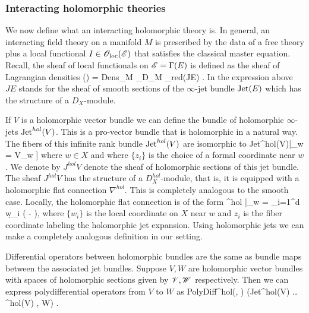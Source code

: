 \documentclass[10pt]{amsart}
\begin{document}
\subsubsection{Interacting holomorphic theories}

\def\olochol{\sO_{\rm loc}^{hol}}

We now define what an interacting holomorphic theory is.
In general, an interacting field theory on a manifold $M$ is prescribed by the data of a free theory plus a local functional $I \in {\mathscr O}_{\rm loc}(\mathscr E)$ that satisfies the classical master equation. 
Recall, the sheaf of local functionals on $\mathscr E = \Gamma(E)$ is defined as the sheaf of Lagrangian densities
\ben
\oloc(\sE) = {\rm Dens}_M \tensor_{D_M} \sO_{red}(JE) .
\een
In the expression above $JE$ stands for the sheaf of smooth sections of the $\infty$-jet bundle ${\rm Jet}(E)$ which has the structure of a $D_X$-module.

If $V$ is a holomorphic vector bundle we can define the bundle of holomorphic $\infty$-jets ${\rm Jet}^{hol}(V)$. 
This is a pro-vector bundle that is holomorphic in a natural way.
The fibers of this infinite rank bundle ${\rm Jet}^{hol}(V)$ are isomorphic to 
\ben
{\rm Jet}^{hol}(V)|_w = V_w \tensor \CC[[z_1,\ldots,z_d]] 
\een
where $w \in X$ and where $\{z_i\}$ is the choice of a formal coordinate near $w$. 
We denote by $J^{hol} V$ denote the sheaf of holomorphic sections of this jet bundle.
The sheaf $J^{hol}V$ has the structure of a $D_X^{hol}$-module, that is, it is equipped with a holomorphic flat connection $\nabla^{hol}$.
This is completely analogous to the smooth case.
Locally, the holomorphic flat connection is of the form
\ben
\nabla^{hol} |_w = \sum_{i=1}^d \d w_i \left( - \right),
\een
where $\{w_i\}$ is the local coordinate on $X$ near $w$ and $z_i$ is the fiber coordinate labeling the holomorphic jet expansion.
Using holomorphic jets we can make a completely analogous definition in our setting.

Differential operators between holomorphic bundles are the same as bundle maps between the associated jet bundles. 
Suppose $V,W$ are holomorphic vector bundles with spaces of holomorphic sections given by $\mathscr V,\mathscr W$ respectively.
Then we can express polydifferential operators from $V$ to $W$ as
\ben
{\rm PolyDiff}^{hol}(\sV \times \cdots \times \sV, \sW) ({\rm Jet}^{\rm hol}(V) \tensor \ldots {}^{\rm hol}(V) , W) .
\een
\end{document}
